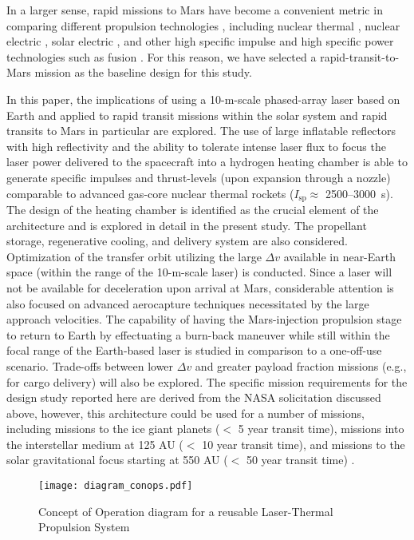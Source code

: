 \documentclass[final,3p,times,twocolumn,sort&compress, lefttitle]{elsarticle}
\begin{document}
        In a larger sense, rapid missions to Mars have become a convenient metric in comparing different propulsion technologies \cite{pelaccio_examination_2002}, including nuclear thermal \cite{borowski_nuclear_2012}, nuclear electric \cite{chang-diaz_fast_2013,berend_feasibility_2014}, solar electric \cite{chang-diaz_solar_2019}, and other high specific impulse and high specific power technologies such as fusion \cite{genta_achieving_2020}. For this reason, we have selected a rapid-transit-to-Mars mission as the baseline design for this study.
        
        In this paper, the implications of using a 10-m-scale phased-array laser based on Earth and applied to rapid transit missions within the solar system and rapid transits to Mars in particular are explored. The use of large inflatable reflectors with high reflectivity and the ability to tolerate intense laser flux to focus the laser power delivered to the spacecraft into a hydrogen heating chamber is able to generate specific impulses and thrust-levels (upon expansion through a nozzle) comparable to advanced gas-core nuclear thermal rockets ($I_\mathrm{sp} \approx$ 2500--3000~s).
        The design of the heating chamber is identified as the crucial element of the architecture and is explored in detail in the present study. The propellant storage, regenerative cooling, and delivery system are also considered. Optimization of the transfer orbit utilizing the large $\Delta v$ available in near-Earth space (within the range of the 10-m-scale laser) is conducted. Since a laser will not be available for deceleration upon arrival at Mars, considerable attention is also focused on advanced aerocapture techniques necessitated by the large approach velocities. The capability of having the Mars-injection propulsion stage to return to Earth by effectuating a burn-back maneuver while still within the focal range of the Earth-based laser is studied in comparison to a one-off-use scenario. Trade-offs between lower $\Delta v$ and greater payload fraction missions (e.g., for cargo delivery) will also be explored. The specific mission requirements for the design study reported here are derived from the NASA solicitation discussed above, however, this architecture could be used for a number of missions, including missions to the ice giant planets ($<$ 5 year transit time), missions into the interstellar medium at 125 AU ($<$ 10 year transit time), and missions to the solar gravitational focus starting at 550 AU ($<$ 50 year transit time) \cite{turyshev_direct_2020}.
        \begin{figure*}[!ht]
            \centering
            \texttt{[image: diagram\_conops.pdf]}
            \caption{Concept of Operation diagram for a reusable Laser-Thermal Propulsion System}
            \label{fig:conops}
        \end{figure*}
    
\end{document}
